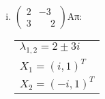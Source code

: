 \documentclass[a4paper,table]{report}
\begin{document}
\begin{enumerate}
\begin{enumerate}[i)]
\item $\begin{pmatrix}
2 & -3 \\
3 & \phantom{-}2
\end{pmatrix}$\hfill Απ: \begin{tabular}{l}
$\lambda_{1,2}=2\pm 3i$ \\
$X_1=(i,1)^T$ \\
$X_2=(-i,1)^T$
\end{tabular}

\end{enumerate}


\end{enumerate}
\end{document}
